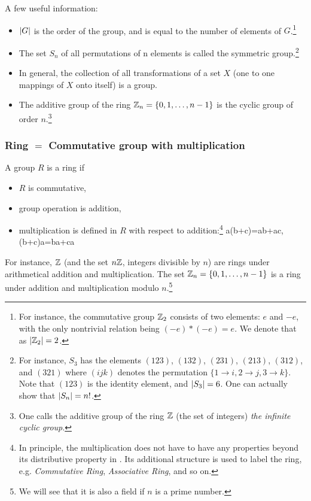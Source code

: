 A few useful information:
\begin{itemize}
\item $\abs{G}$ is the order of the group, and is equal to the number of elements of $G$.\footnote{For instance, the commutative group $\mathbb{Z}_2$ consists of two elements: $e$ and $-e$, with the only nontrivial relation being $(-e)*(-e)=e$. We denote that as $\abs{\mathbb{Z}_2}=2$.}

\item The set $S_n$ of all permutations of n elements is called the symmetric group.\footnote{For instance, $S_3$ has the elements $(123)$, $(132)$, $(231)$, $(213)$, $(312)$, and $(321)$ where $(ijk)$ denotes the permutation $\{1\to i, 2\to j, 3\to k\}$. Note that $(123)$ is the identity element, and $\abs{S_3}=6$. One can actually show that $\abs{S_n}=n!$.}

\item In general, the collection of all transformations of a set $X$ (one to one mappings of $X$ onto itself) is a group.

\item The additive group of the ring $\mathbb{Z}_n=\{0,1,\dots,n-1\}$ is the cyclic group of order $n$.\footnote{One calls the additive group of the ring $\mathbb{Z}$ (the set of integers) \emph{the infinite cyclic group}.}
\end{itemize}

\subsubsection{Ring $=$ Commutative group with multiplication}
A group $R$ is a ring if
\begin{itemize}
	\item $R$ is commutative,
	\item group operation is addition,
	\item multiplication is defined in $R$ with respect to addition:\footnote{In principle, the multiplication does not have to have any properties beyond its distributive property in . Its additional structure is used to label the ring, e.g. \emph{Commutative Ring}, \emph{Associative Ring}, and so on.}
	\be 
	\label{eq: distributive property of multiplication in ring}
	a(b+c)=ab+ac\;,(b+c)a=ba+ca
	\ee 
\end{itemize}
For instance, $\mathbb{Z}$ (and the set $n\mathbb{Z}$, integers divisible by $n$) are rings under arithmetical addition and multiplication. The set $\mathbb{Z}_n=\{0,1,\dots,n-1\}$ is a ring under addition and multiplication modulo $n$.\footnote{We will see that it is also a field if $n$ is a prime number.}

